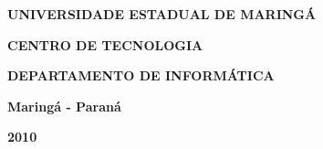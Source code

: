
\vspace{4cm}

\begin{center}

\textbf{UNIVERSIDADE ESTADUAL DE MARINGÁ}

\textbf{CENTRO DE TECNOLOGIA}

\textbf{DEPARTAMENTO DE INFORMÁTICA}

\vspace{4cm}

\textbf{\MakeUppercase{\doctitulo}}

\vspace{1cm}

\docautor

\vspace{1cm}

\end{center}

\vspace{10cm}

\begin{center}
\centering
\textbf{Maringá - Paraná}

\textbf{2010}
\end{center}


\pagebreak
